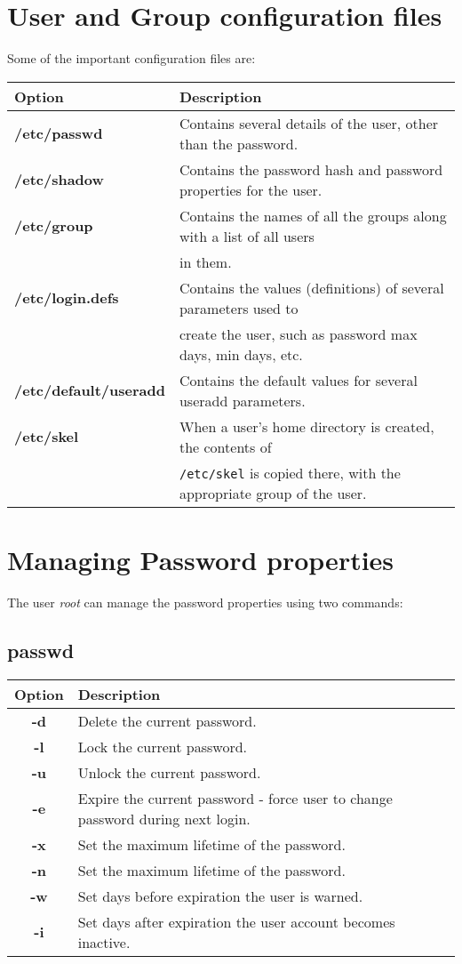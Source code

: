 \section{User and Group configuration files}
Some of the important configuration files are:

\noindent
\begin{tabular}{ll}
	\toprule
	\textbf{Option} &\textbf{Description} \\
	\midrule
	\textbf{/etc/passwd} &Contains several details of the user, other than the password.  \\
	\textbf{/etc/shadow} &Contains the password hash and password properties for the user. \\
	\textbf{/etc/group} &Contains the names of all the groups along with a list of all users \\&in them. \\
	\textbf{/etc/login.defs} &Contains the values (definitions) of several parameters used to \\&create the user, such as password max days, min days, etc.\\
	\textbf{/etc/default/useradd} &Contains the default values for several useradd parameters. \\
	\textbf{/etc/skel} &When a user's home directory is created, the contents of \\&\verb|/etc/skel| is copied there, with the appropriate group of the user.\\
	\bottomrule
\end{tabular}

\section{Managing Password properties}
The user \textit{root} can manage the password properties using two commands:

\subsection{passwd}
\begin{tabular}{cl}
	\toprule
	\textbf{Option} &\textbf{Description} \\
	\midrule
	\textbf{-d} &Delete the current password. \\
	\textbf{-l} &Lock the current password. \\
	\textbf{-u} &Unlock the current password. \\
	\textbf{-e} &Expire the current password - force user to change password during next login. \\
	\textbf{-x} &Set the maximum lifetime of the password. \\
	\textbf{-n} &Set the maximum lifetime of the password. \\
	\textbf{-w} &Set days before expiration the user is warned. \\ 
	\textbf{-i} &Set days after expiration the user account becomes inactive. \\
	\bottomrule
\end{tabular}

